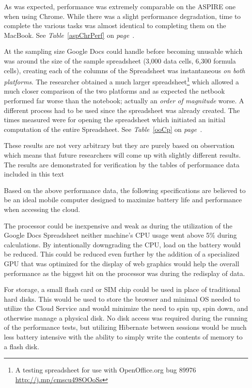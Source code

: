 As was expected, performance was extremely comparable on the ASPIRE one when
using Chrome.  While there was a slight performance degradation, time to
complete the various tasks was almost identical to completing them on the
MacBook.  See \emph{Table}~\ref{aspChrPerf} on \emph{page}~\pageref{aspChrPerf}.



At the sampling size Google Docs could handle before becoming unusable which was
around the size of the sample spreadsheet (3,000 data cells, 6,300 formula
cells), creating each of the columns of the Spreadsheet was instantaneous
\emph{on both platforms}.  The researcher obtained a much larger
spreadsheet\footnote{A testing spreadsheet for use with OpenOffice.org bug 89976
  \url{http://j.mp/cmscu498OOoSs}} which allowed a much closer comparison of the
two platforms and as expected the netbook performed far worse than the notebook;
actually an \emph{order of magnitude} worse.  A different process had to be used
since the spreadsheet was already created.  The times measured were for opening
the spreadsheet which initiated an initial computation of the entire
Spreadsheet.  See \emph{Table}~\ref{ooCp} on \emph{page}~\pageref{ooCp}.



These results are not very arbitrary but they are purely based on observation
which means that future researchers will come up with slightly different
results.  The results are demonstrated for verification by the tables of
performance data included in this text

Based on the above performance data, the following specifications are believed
to be an ideal mobile computer designed to maximize battery life and performance
when accessing the cloud.

The processor could be inexpensive and weak as during the utilization of the
Google Docs Spreadsheet neither machine's CPU usage went above 5\% during
calculations.  By intentionally downgrading the CPU, load on the battery would
be reduced.  This could be reduced even further by the addition of a specialized
GPU that was optimized for the display of web graphics would help the overall
performance as the biggest hit on the processor was during the redisplay of
data.

For storage, a small flash card or SIM chip could be used in place of
traditional hard disks.  This would be used to store the browser and minimal OS
needed to utilize the Cloud Service and would minimize the need to spin up, spin
down, and otherwise manage a physical disk.  No disk access was required during
the running of the performance tests, but utilizing Hibernate between sessions
would be much less battery intensive with the ability to simply write the
contents of memory to a flash disk.

